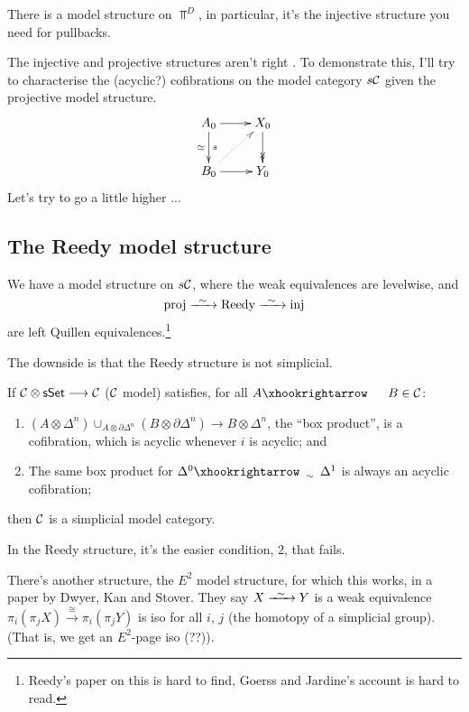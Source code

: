 \documentclass[11pt]{article}
\begin{document}
\begin{InnaSimplicalModelCats}
There is a model structure on $\Top^D$, in particular, it's the injective structure you need for pullbacks. 

The injective and projective structures aren't right . To demonstrate this, I'll try to characterise the (acyclic?) cofibrations on the model category $s\mathcal{C}$ given the projective model structure.
\[\xymatrix{
A_0\ar[r]\ar[d]^s_\simeq&X_0\ar@{->>}[d]\\
B_0\ar[r]\ar@{..>}[ur]&Y_0
}\]
Let's try to go a little higher ...
\subsection*{The Reedy model structure}
\begin{thm*}
We have a model structure on $s\mathcal{C}$, where the weak equivalences are levelwise, and
\[\textup{proj}\weakequiv\textup{Reedy}\weakequiv\textup{inj}\]
are left Quillen equivalences.\footnote{Reedy's paper on this is hard to find, Goerss and Jardine's account is hard to read.}
\end{thm*}
 The downside is that the Reedy structure is not simplicial.
\begin{thm*}
If $\mathcal{C}\otimes \operatorname{{\mathsf{sSet}}}\longrightarrow \mathcal{C}$ ($\mathcal{C}$ model) satisfies, for all $A\cofibration B\in\calC$:
\begin{enumerate}\squishlist
\item $(A\otimes \Delta^n)\cup_{A\otimes\partial\Delta^n}(B\otimes\partial\Delta^n)\to B\otimes\Delta^n$, the ``box product'', is a cofibration, which is acyclic whenever $i$ is acyclic; and
\item The same box product for $\Delta^0\acycliccofibration\Delta^1$ is always an acyclic cofibration;
\end{enumerate}
then $\mathcal{C}$ is a simplicial model category.
\end{thm*}
\noindent In the Reedy structure, it's the easier condition, 2, that fails.

There's another structure, the $E^2$ model structure, for which this works, in a paper by Dwyer, Kan and Stover. They say $X\weakequiv Y$ is a weak equivalence \Iff $\pi_i(\pi_j X)\overset{\cong}{\to}\pi_i(\pi_j  Y)$ is iso for all $i$, $j$ (the homotopy of a simplicial group). (That is, we get an $E^2$-page iso (??)).

\end{InnaSimplicalModelCats}
\end{document}
